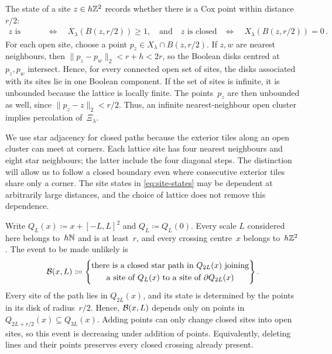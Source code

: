 \documentclass[11pt,letterpaper]{article}
\begin{document}
The state of a site $z\in h\mathbb Z^2$ records whether there is a Cox point within distance~$r/2$:
\begin{equation}\label{eq:site-states}
  \begin{aligned}
    z\text{ is open}&\quad\Longleftrightarrow\quad X_\lambda(B(z,r/2))\ge1,\quad\text{and}\quad
    z\text{ is closed}&\quad\Longleftrightarrow\quad X_\lambda(B(z,r/2))=0\,.
  \end{aligned}
\end{equation}
For each open site, choose a point $p_z\in X_\lambda\cap B(z,r/2)$. If $z,w$ are nearest neighbours, then $\lVert p_z-p_w\rVert_2<r+h<2r$, so the Boolean disks centred at $p_z,p_w$ intersect. Hence, for every connected open set of sites, the disks associated with its sites lie in one Boolean component. If the set of sites is infinite, it is unbounded because the lattice is locally finite. The points~$p_z$ are then unbounded as well, since $\lVert p_z-z\rVert_2<r/2$. Thus, an infinite nearest-neighbour open cluster implies percolation of~$\Xi_\lambda$.

We use star adjacency for closed paths because the exterior tiles along an open cluster can meet at corners. Each lattice site has four nearest neighbours and eight star neighbours; the latter include the four diagonal steps. The distinction will allow us to follow a closed boundary even where consecutive exterior tiles share only a corner. The site states in \eqref{eq:site-states} may be dependent at arbitrarily large distances, and the choice of lattice does not remove this dependence.

Write $Q_L(x)\coloneqq x+[-L,L]^2$ and $Q_L\coloneqq Q_L(0)$. Every scale $L$ considered here belongs to~$h\mathbb N$ and is at least~$r$, and every crossing centre~$x$ belongs to~$h\mathbb Z^2$. The event to be made unlikely is
\begin{equation}\label{eq:bad-crossing}
  \mathcal B(x,L)\coloneqq\Bigg\{
    \begin{gathered}
      \text{there is a closed star path in }Q_{2L}(x)\text{ joining}\\
      \text{a site of }Q_L(x)\text{ to a site of }\partial Q_{2L}(x)
    \end{gathered}
  \Bigg\}\,.
\end{equation}
Every site of the path lies in $Q_{2L}(x)$, and its state is determined by the points in its disk of radius~$r/2$. Hence, $\mathcal B(x,L)$ depends only on points in $Q_{2L+r/2}(x)\subseteq Q_{3L}(x)$. Adding points can only change closed sites into open sites, so this event is decreasing under addition of points. Equivalently, deleting lines and their points preserves every closed crossing already present.
\end{document}
